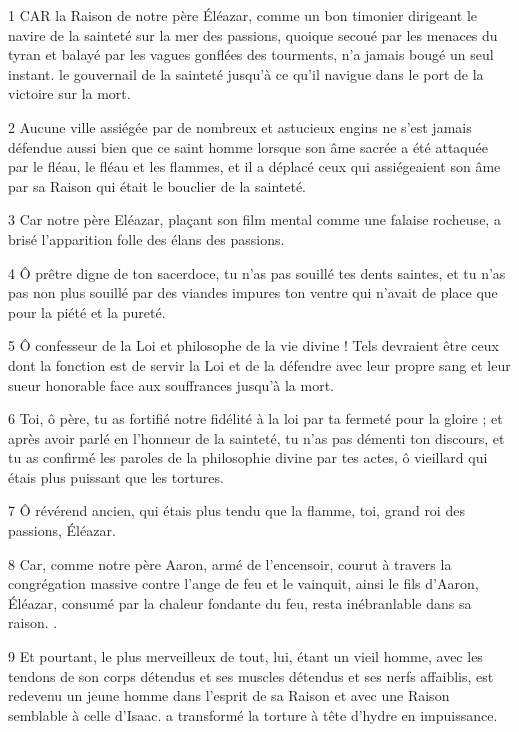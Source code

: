 \par 1 CAR la Raison de notre père Éléazar, comme un bon timonier dirigeant le navire de la sainteté sur la mer des passions, quoique secoué par les menaces du tyran et balayé par les vagues gonflées des tourments, n'a jamais bougé un seul instant. le gouvernail de la sainteté jusqu'à ce qu'il navigue dans le port de la victoire sur la mort.

\par 2 Aucune ville assiégée par de nombreux et astucieux engins ne s'est jamais défendue aussi bien que ce saint homme lorsque son âme sacrée a été attaquée par le fléau, le fléau et les flammes, et il a déplacé ceux qui assiégeaient son âme par sa Raison qui était le bouclier de la sainteté.

\par 3 Car notre père Eléazar, plaçant son film mental comme une falaise rocheuse, a brisé l'apparition folle des élans des passions.

\par 4 Ô prêtre digne de ton sacerdoce, tu n'as pas souillé tes dents saintes, et tu n'as pas non plus souillé par des viandes impures ton ventre qui n'avait de place que pour la piété et la pureté.

\par 5 Ô confesseur de la Loi et philosophe de la vie divine ! Tels devraient être ceux dont la fonction est de servir la Loi et de la défendre avec leur propre sang et leur sueur honorable face aux souffrances jusqu'à la mort.

\par 6 Toi, ô père, tu as fortifié notre fidélité à la loi par ta fermeté pour la gloire ; et après avoir parlé en l'honneur de la sainteté, tu n'as pas démenti ton discours, et tu as confirmé les paroles de la philosophie divine par tes actes, ô vieillard qui étais plus puissant que les tortures.

\par 7 Ô révérend ancien, qui étais plus tendu que la flamme, toi, grand roi des passions, Éléazar.

\par 8 Car, comme notre père Aaron, armé de l'encensoir, courut à travers la congrégation massive contre l'ange de feu et le vainquit, ainsi le fils d'Aaron, Éléazar, consumé par la chaleur fondante du feu, resta inébranlable dans sa raison. .

\par 9 Et pourtant, le plus merveilleux de tout, lui, étant un vieil homme, avec les tendons de son corps détendus et ses muscles détendus et ses nerfs affaiblis, est redevenu un jeune homme dans l'esprit de sa Raison et avec une Raison semblable à celle d'Isaac. a transformé la torture à tête d'hydre en impuissance.

